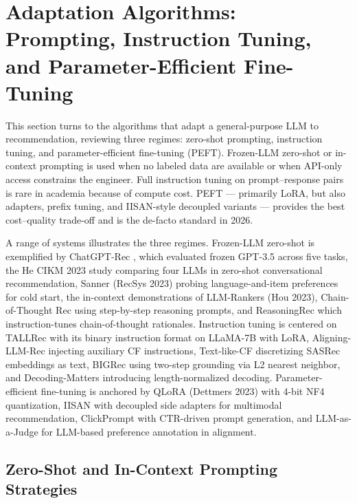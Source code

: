 \documentclass{article}
\begin{document}
\section{Adaptation Algorithms: Prompting, Instruction Tuning, and Parameter-Efficient Fine-Tuning}\label{adaptation-algorithms-prompting-instruction-tuning-and-parameter-efficient-fine-tuning}

This section turns to the algorithms that adapt a general-purpose LLM to recommendation, reviewing three regimes: zero-shot prompting, instruction tuning, and parameter-efficient fine-tuning (PEFT). Frozen-LLM zero-shot or in-context prompting is used when no labeled data are available or when API-only access constrains the engineer. Full instruction tuning on prompt--response pairs is rare in academia because of compute cost. PEFT --- primarily LoRA, but also adapters, prefix tuning, and IISAN-style decoupled variants --- provides the best cost--quality trade-off and is the de-facto standard in 2026.

A range of systems illustrates the three regimes. Frozen-LLM zero-shot is exemplified by ChatGPT-Rec \citep{liu2023tacl2023}, which evaluated frozen GPT-3.5 across five tasks, the He CIKM 2023 study comparing four LLMs in zero-shot conversational recommendation, Sanner (RecSys 2023) probing language-and-item preferences for cold start, the in-context demonstrations of LLM-Rankers (Hou 2023), Chain-of-Thought Rec \citep{yang2024chainofthoughtprom} using step-by-step reasoning prompts, and ReasoningRec \citep{bismay2024arxiv2410231802024} which instruction-tunes chain-of-thought rationales. Instruction tuning is centered on TALLRec \citep{bao2023arxiv2305004472023} with its binary instruction format on LLaMA-7B with LoRA, Aligning-LLM-Rec \citep{cao2024aligninglargelangu} injecting auxiliary CF instructions, Text-like-CF \citep{bao2024decodingmattersadd} discretizing SASRec embeddings as text, BIGRec \citep{bao2023arxiv2305004472023} using two-step grounding via L2 nearest neighbor, and Decoding-Matters \citep{bao2024decodingmattersadd} introducing length-normalized decoding. Parameter-efficient fine-tuning is anchored by QLoRA (Dettmers 2023) with 4-bit NF4 quantization, IISAN \citep{fu2024iisanefficientlyad} with decoupled side adapters for multimodal recommendation, ClickPrompt \citep{lin2023clickpromptctrmode} with CTR-driven prompt generation, and LLM-as-a-Judge \citep{pradhan2025llmasajudgerapidev} for LLM-based preference annotation in alignment.

\subsection{Zero-Shot and In-Context Prompting Strategies}\label{zero-shot-and-in-context-prompting-strategies}
\end{document}
